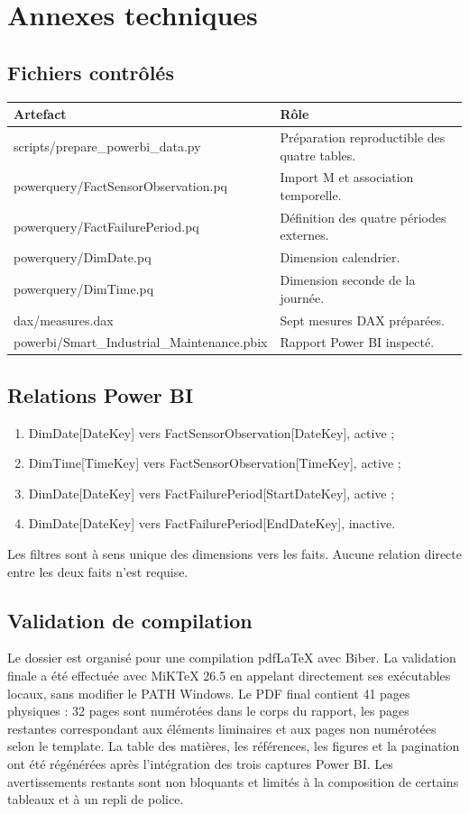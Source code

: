 \chapter{Annexes techniques}

\section{Fichiers contrôlés}
\begin{tabularx}{\textwidth}{lX}
\toprule
\textbf{Artefact} & \textbf{Rôle}\\
\midrule
scripts/prepare\_powerbi\_data.py & Préparation reproductible des quatre tables.\\
powerquery/FactSensorObservation.pq & Import M et association temporelle.\\
powerquery/FactFailurePeriod.pq & Définition des quatre périodes externes.\\
powerquery/DimDate.pq & Dimension calendrier.\\
powerquery/DimTime.pq & Dimension seconde de la journée.\\
dax/measures.dax & Sept mesures DAX préparées.\\
powerbi/Smart\_Industrial\_Maintenance.pbix & Rapport Power BI inspecté.\\
\bottomrule
\end{tabularx}

\section{Relations Power BI}
\begin{enumerate}
\item DimDate[DateKey] vers FactSensorObservation[DateKey], active ;
\item DimTime[TimeKey] vers FactSensorObservation[TimeKey], active ;
\item DimDate[DateKey] vers FactFailurePeriod[StartDateKey], active ;
\item DimDate[DateKey] vers FactFailurePeriod[EndDateKey], inactive.
\end{enumerate}
Les filtres sont à sens unique des dimensions vers les faits. Aucune relation directe entre les deux faits n'est requise.

\section{Validation de compilation}
Le dossier est organisé pour une compilation pdfLaTeX avec Biber. La validation finale a été effectuée avec MiKTeX 26.5 en appelant directement ses exécutables locaux, sans modifier le PATH Windows. Le PDF final contient 41 pages physiques : 32 pages sont numérotées dans le corps du rapport, les pages restantes correspondant aux éléments liminaires et aux pages non numérotées selon le template. La table des matières, les références, les figures et la pagination ont été régénérées après l'intégration des trois captures Power BI. Les avertissements restants sont non bloquants et limités à la composition de certains tableaux et à un repli de police.

